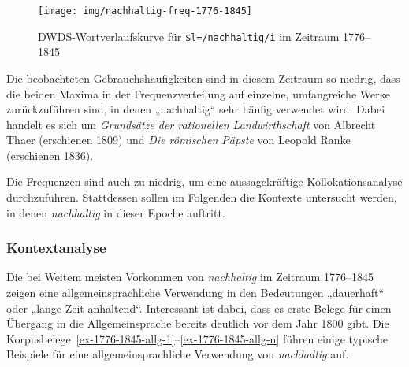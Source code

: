 \documentclass[
    german,
    a4paper,%
    12pt,%
    oneside,%
    toc=bibliography,
    final,
]{scrartcl}
\begin{document}
\begin{figure}[h!]
	\centering
	
	\texttt{[image: img/nachhaltig-freq-1776-1845]}
	\caption[corpus-size]{DWDS-Wortverlaufskurve für \lstinline|$l=/nachhaltig/i| im Zeitraum 1776–1845\protect\footnotemark}
	\label{fig:nachhaltig-freq-1776-1845}
\end{figure}

Die beobachteten Gebrauchshäufigkeiten sind in diesem Zeitraum so niedrig, dass die beiden Maxima in der Frequenzverteilung auf einzelne, umfangreiche Werke zurückzuführen sind, in denen „nachhaltig“ sehr häufig verwendet wird. Dabei handelt es sich um \textit{Grundsätze der rationellen Landwirthschaft} von Albrecht Thaer (erschienen 1809) und \textit{Die römischen Päpste} von Leopold Ranke (erschienen 1836).


Die Frequenzen sind auch zu niedrig, um eine aussagekräftige Kollokationsanalyse durchzuführen. Stattdessen sollen im Folgenden die Kontexte untersucht werden, in denen \textit{nachhaltig} in dieser Epoche auftritt.

\subsubsection{Kontextanalyse}

Die bei Weitem meisten Vorkommen von \textit{nachhaltig} im Zeitraum 1776–1845 zeigen eine allgemeinsprachliche Verwendung in den Bedeutungen „dauerhaft“ oder „lange Zeit anhaltend“. Interessant ist dabei, dass es erste Belege für einen Übergang in die Allgemeinsprache bereits deutlich vor dem Jahr 1800 gibt. Die Korpusbelege~\ref{ex-1776-1845-allg-1}–\ref{ex-1776-1845-allg-n} führen einige typische Beispiele für eine allgemeinsprachliche Verwendung von \textit{nachhaltig} auf.
\end{document}
